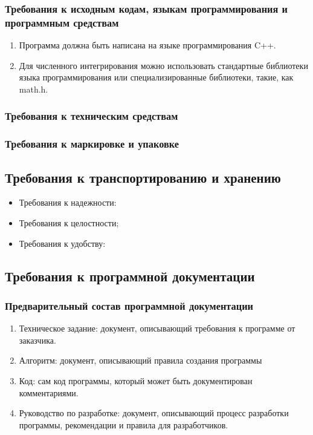  \subsubsection{ Требования к исходным кодам, языкам программирования и программным средствам}
 \begin{enumerate}
  \item Программа должна быть написана на языке программирования C++.
  \item Для численного интегрирования можно использовать стандартные библиотеки языка программирования или специализированные библиотеки, такие, как math.h.
 \end{enumerate}


 \subsubsection{Требования к техническим средствам}
 \subsubsection{Требования к маркировке и упаковке}
 \subsection{Требования к транспортированию и хранению}
 \begin{itemize}
  \item Требования к надежности:
  \item Требования к целостности;
  \item Требования к удобству:
 \end{itemize}

 \subsection{Требования к программной документации}

 \subsubsection{Предварительный состав программной документации}
 \begin{enumerate}
  \item Техническое задание: документ, описывающий требования к программе от заказчика.
  \item Алгоритм: документ, описывающий правила создания программы
  \item Код: сам код программы, который может быть документирован комментариями.
  \item Руководство по разработке: документ, описывающий процесс разработки программы, рекомендации и правила для разработчиков.
 \end{enumerate}

